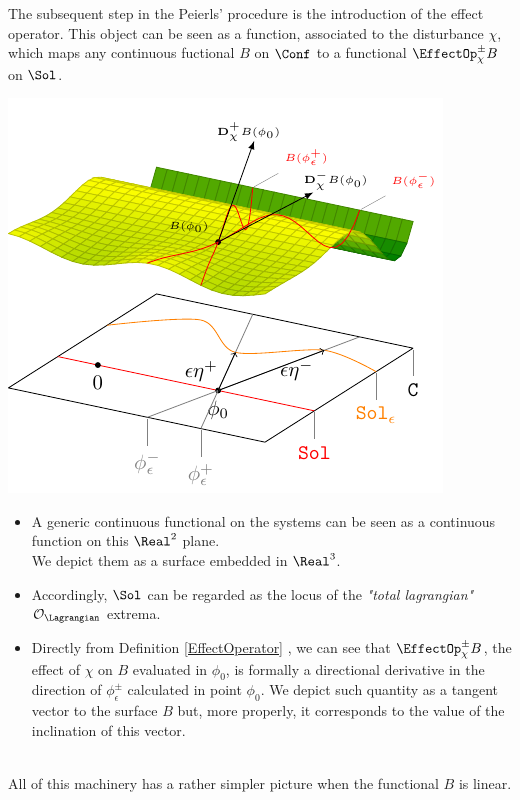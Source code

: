 \documentclass[Main]{subfiles}
\begin{document}
		The subsequent step in the Peierls' procedure is the introduction of the effect operator. 
		This object can be seen as a function, associated to the disturbance $\chi$, which maps any continuous fuctional $B$ on $\Conf$ to a functional $\EffectOp_\chi^\pm B$ on $\Sol$. 

		\vspace{1mm}		
		\begin{minipage}{0.5\textwidth}
			\includegraphics[width=\textwidth]{Pictures/GeometricPicture3}
		\end{minipage}
		\begin{minipage}{0.5\textwidth}
			\begin{itemize}
				\item  A generic continuous functional on the systems can be seen as a continuous function on this $\Real^2$ plane. \\ We depict them as a surface embedded in $\Real^3$.
				\item  Accordingly, $\Sol$ can be regarded as the locus of the  \emph{"total lagrangian"} $  \mathcal{O}_\Lagrangian$ extrema.
				\item	Directly from Definition \ref{EffectOperator} , we can see that $\EffectOp_\chi^\pm B$, the effect of $\chi$ on $B$ evaluated in $\phi_0$, is formally a directional derivative in the direction of $\phi_\epsilon^\pm$ calculated in point $\phi_0$.
					We depict such quantity as a tangent vector to the surface $B$ but, more properly, it corresponds to the value of the inclination of this vector.
			\end{itemize}
		\end{minipage}
		\vspace{1mm}\\	
		All of this machinery has a rather simpler picture when the functional $B$ is linear.
\end{document}
